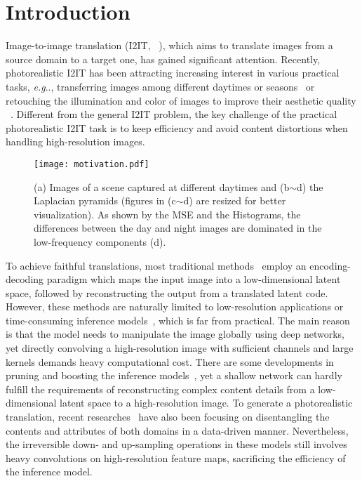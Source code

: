 \documentclass[10pt,twocolumn,letterpaper]{article}
\makeatletter
\DeclareRobustCommand\onedot{\futurelet\@let@token\@onedot}
\def\@onedot{\ifx\@let@token.\else.\null\fi\xspace}
\def\eg{\emph{e.g}\onedot} \def\Eg{\emph{E.g}\onedot}
\makeatother
\begin{document}
\section{Introduction}
	
	Image-to-image translation (I2IT, ~\cite{zhang2019harmonic, hoffman2017cycada, ma2018exemplar}), which aims to translate images from a source domain to a target one, has gained significant attention. Recently, photorealistic I2IT has been attracting increasing interest in various practical tasks, \eg, transferring images among different daytimes or seasons~\cite{hoffman2017cycada} or retouching the illumination and color of images to improve their aesthetic quality ~\cite{chen2018deep}. Different from the general I2IT problem, the key challenge of the practical photorealistic I2IT task is to keep efficiency and avoid content distortions when handling high-resolution images.
	
	
	\begin{figure}[t]
		\centering
		\texttt{[image: motivation.pdf]}
		\caption{(a) Images of a scene captured at different daytimes and (b$\sim$d) the Laplacian pyramids (figures in (c$\sim$d) are resized for better visualization).
As shown by the MSE and the Histograms, the differences between the day and night images are dominated in the low-frequency components (d).
			\label{motivation}
		}
	\end{figure}
	
	To achieve faithful translations, most traditional methods~\cite{zhu2017unpaired, wang2018high, isola2017image} employ an encoding-decoding paradigm which maps the input image into a low-dimensional latent space, followed by reconstructing the output from a translated latent code. However, these methods are naturally limited to low-resolution applications or time-consuming inference models~\cite{zhu2017unpaired, wang2018high, isola2017image, li2018closed, luan2017deep, lee2018diverse}, which is far from practical. The main reason is that the model needs to manipulate the image globally using deep networks, yet directly convolving a high-resolution image with sufficient channels and large kernels demands heavy computational cost. There are some developments in pruning and boosting the inference models~\cite{johnson2016perceptual, huang2017real, li2019learning}, yet a shallow network can hardly fulfill the requirements of reconstructing complex content details from a low-dimensional latent space to a high-resolution image. To generate a photorealistic translation, recent researches~\cite{gonzalez2018image, huang2017arbitrary, huang2018multimodal} have also been focusing on disentangling the contents and attributes of both domains in a data-driven manner. Nevertheless, the irreversible down- and up-sampling operations in these models still involves heavy convolutions on high-resolution feature maps, sacrificing the efficiency of the inference model.
\end{document}
